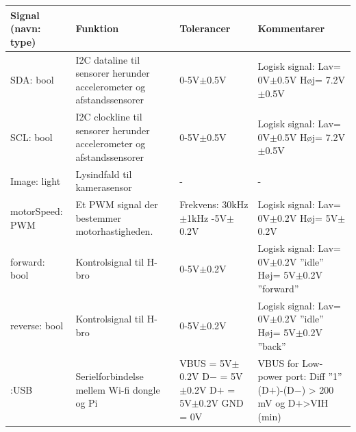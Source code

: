 \begin{table}[h]
	\centering
	\begin{tabularx}{\textwidth}{|l|Z|Z|Z|} \hline
	\textbf{Signal (navn: type)} & \textbf{Funktion} & \textbf{Tolerancer} & \textbf{Kommentarer} \\ \hline
SDA: bool
	& I2C dataline til sensorer herunder accelerometer og afstandssensorer  
	& 0-5V$\pm$0.5V 
 	& Logisk signal: 			\newline
		Lav= 0V$\pm$0.5V  	\newline
		Høj= 7.2V$\pm$0.5V
	\\ \hline
	
SCL: bool
	& I2C clockline  til sensorer herunder accelerometer og afstandssensorer
	& 0-5V$\pm$0.5V
	& Logisk signal:			\newline 
		Lav= 0V$\pm$0.5V 	\newline
		Høj= 7.2V$\pm$0.5V
	\\ \hline
	
Image: light
	& Lysindfald til kamerasensor
	& -
	& -
	\\ \hline

motorSpeed: PWM	
	& Et PWM signal der bestemmer motorhastigheden.	
	& Frekvens: 30kHz$\pm$1kHz -5V$\pm$0.2V	
	& Logisk signal: 			\newline 
		Lav= 0V$\pm$0.2V 	\newline
		Høj= 5V$\pm$0.2V
	\\ \hline
	
forward: bool	
	& Kontrolsignal til H-bro
	& 0-5V$\pm$0.2V
	& Logisk signal:					\newline 
		Lav= 0V$\pm$0.2V  ''idle''		\newline
		Høj= 5V$\pm$0.2V  ''forward''
	\\ \hline
	
reverse: bool	
	& Kontrolsignal til H-bro
	& 0-5V$\pm$0.2V	
	& Logisk signal: 					\newline
		Lav= 0V$\pm$0.2V ''idle''		\newline
		Høj= 5V$\pm$0.2V ''back''
	\\ \hline
	
:USB 	
	& Serielforbindelse mellem Wi-fi dongle og Pi	
	& VBUS = 5V$\pm$0.2V 				\newline 
	  D$-$ = 5V$\pm$0.2V				\newline
	  D$+$ = 5V$\pm$0.2V				\newline
	  GND = 0V							\newline	  
	  & VBUS for Low-power port: 		\newline
		Diff  ''1''						\newline
		(D$+$)-(D$-$) > 200 mV			\newline
		og D$+$>VIH (min)				\newline


\end{tabularx}
\end{table}
